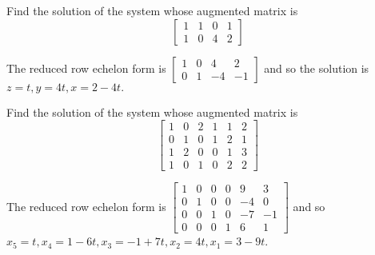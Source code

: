 \documentclass{ximera}
\begin{document}
\begin{problem}\label{prb:2.27} Find the solution of the system whose augmented matrix is
\begin{equation*}
\left[
\begin{array}{rrr|r}
1 & 1 & 0 & 1 \\
1 & 0 & 4 & 2
\end{array}
\right]
\end{equation*}
\begin{hint}
The reduced row echelon form is $\left[
\begin{array}{rrr|r}
1 & 0 & 4 & 2 \\
0 & 1 & -4 & -1
\end{array}
\right] $ and so the solution is $z=t,y=4t,x=2-4t.$
\end{hint}
\end{problem}

\begin{problem}\label{prb:2.28} Find the solution of the system whose augmented matrix is
\begin{equation*}
\left[
\begin{array}{rrrrr|r}
1 & 0 & 2 & 1 & 1 & 2 \\
0 & 1 & 0 & 1 & 2 & 1 \\
1 & 2 & 0 & 0 & 1 & 3 \\
1 & 0 & 1 & 0 & 2 & 2
\end{array}
\right]
\end{equation*}
\begin{hint}
The reduced row echelon form is $\left[
\begin{array}{rrrrr|r}
1 & 0 & 0 & 0 & 9 & 3 \\
0 & 1 & 0 & 0 & -4 & 0 \\
0 & 0 & 1 & 0 & -7 & -1 \\
0 & 0 & 0 & 1 & 6 & 1
\end{array}
\right] $ and so $x_{5}=t,x_{4}=1-6t,x_{3}=-1+7t,x_{2}=4t,x_{1}=3-9t$.
\end{hint}
\end{problem}
\end{document}
